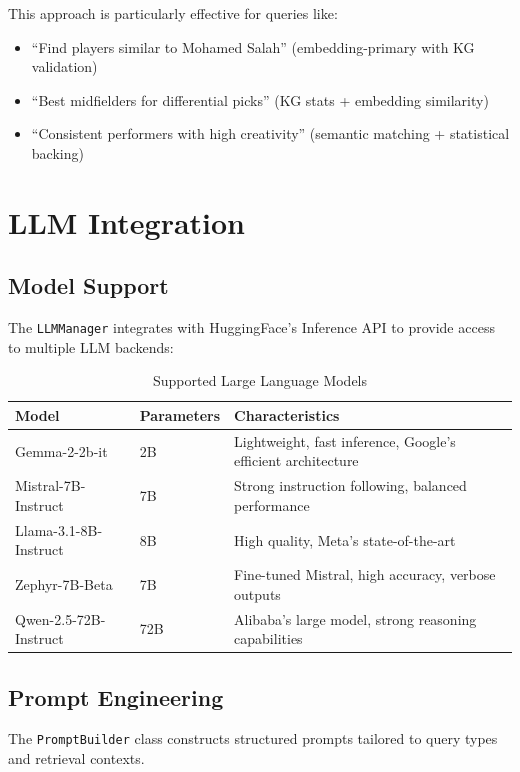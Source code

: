 \documentclass[11pt, a4paper]{article}
\begin{document}
This approach is particularly effective for queries like:
\begin{itemize}
    \item ``Find players similar to Mohamed Salah'' (embedding-primary with KG validation)
    \item ``Best midfielders for differential picks'' (KG stats + embedding similarity)
    \item ``Consistent performers with high creativity'' (semantic matching + statistical backing)
\end{itemize}

\section{LLM Integration}
\label{sec:llm}

\subsection{Model Support}
The \texttt{LLMManager} integrates with HuggingFace's Inference API to provide access to multiple LLM backends:

\begin{table}[H]
\centering
\caption{Supported Large Language Models}
\label{tab:llm_models}
\begin{tabular}{@{}llp{5cm}@{}}
\toprule
\textbf{Model} & \textbf{Parameters} & \textbf{Characteristics} \\
\midrule
Gemma-2-2b-it & 2B & Lightweight, fast inference, Google's efficient architecture \\
Mistral-7B-Instruct & 7B & Strong instruction following, balanced performance \\
Llama-3.1-8B-Instruct & 8B & High quality, Meta's state-of-the-art \\
Zephyr-7B-Beta & 7B & Fine-tuned Mistral, high accuracy, verbose outputs \\
Qwen-2.5-72B-Instruct & 72B & Alibaba's large model, strong reasoning capabilities \\
\bottomrule
\end{tabular}
\end{table}

\subsection{Prompt Engineering}
The \texttt{PromptBuilder} class constructs structured prompts tailored to query types and retrieval contexts.
\end{document}
